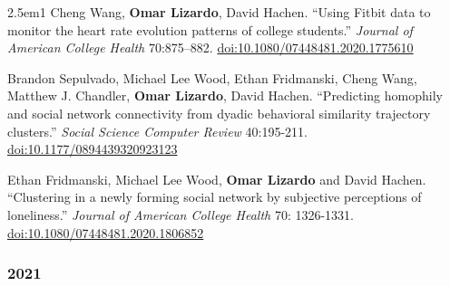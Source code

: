\documentclass[
]{article}
\newenvironment{cventry}{\begin{hangparas}{2.5em}{1}}{\end{hangparas}}
\begin{document}
\begin{cventry}
Cheng Wang, \textbf{Omar Lizardo}, David Hachen. ``Using Fitbit data to
monitor the heart rate evolution patterns of college students.''
\emph{Journal of American College Health} 70:875--882.
\href{https://doi.org/10.1080/07448481.2020.1775610}{doi:10.1080/07448481.2020.1775610}

Brandon Sepulvado, Michael Lee Wood, Ethan Fridmanski, Cheng Wang,
Matthew J. Chandler, \textbf{Omar Lizardo}, David Hachen. ``Predicting
homophily and social network connectivity from dyadic behavioral
similarity trajectory clusters.'' \emph{Social Science Computer Review}
40:195-211.
\href{https://doi.org/10.1177/0894439320923123}{doi:10.1177/0894439320923123}

Ethan Fridmanski, Michael Lee Wood, \textbf{Omar Lizardo} and David
Hachen. ``Clustering in a newly forming social network by subjective
perceptions of loneliness.'' \emph{Journal of American College Health}
70: 1326-1331.
\href{https://doi.org/10.1080/07448481.2020.1806852}{doi:10.1080/07448481.2020.1806852}

\end{cventry}

\subsubsection{2021}\label{section-2}
\end{document}
